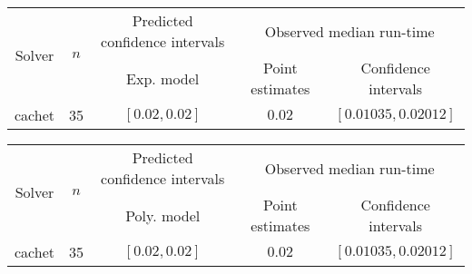 \begin{tabular}{ccccc}
\hline 
\multirow{2}{*}{Solver} & \multirow{2}{*}{$n$} & Predicted confidence intervals & \multicolumn{2}{c}{Observed median  run-time}\tabularnewline
 &  & Exp. model  & Point estimates  & Confidence intervals\tabularnewline
\hline 
\hline 
\multirow{0}{*}{cachet} & 35 & $\mathbf{\left[0.02,0.02\right]}$ & $0.02$ & $\left[0.01035,0.02012\right]$ \tabularnewline 
\hline 
\end{tabular} 

\begin{tabular}{ccccc}
\hline 
\multirow{2}{*}{Solver} & \multirow{2}{*}{$n$} & Predicted confidence intervals & \multicolumn{2}{c}{Observed median  run-time}\tabularnewline
 &  & Poly. model  & Point estimates  & Confidence intervals\tabularnewline
\hline 
\hline 
\multirow{0}{*}{cachet} & 35 & $\mathbf{\left[0.02,0.02\right]}$ & $0.02$ & $\left[0.01035,0.02012\right]$ \tabularnewline 
\hline 
\end{tabular} 


